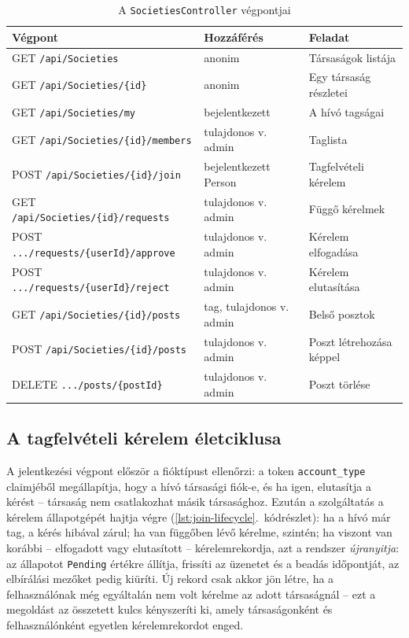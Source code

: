 \begin{table}[htbp]
	\centering
	\caption{A \texttt{SocietiesController} végpontjai}
	\label{tab:soc-endpoints}
	\begin{tabular}{|l|l|p{5.2cm}|}
		\hline
		\textbf{Végpont} & \textbf{Hozzáférés} & \textbf{Feladat} \\
		\hline
		GET \texttt{/api/Societies} & anonim & Társaságok listája \\
		\hline
		GET \texttt{/api/Societies/\{id\}} & anonim & Egy társaság részletei \\
		\hline
		GET \texttt{/api/Societies/my} & bejelentkezett & A hívó tagságai \\
		\hline
		GET \texttt{/api/Societies/\{id\}/members} & tulajdonos v. admin & Taglista \\
		\hline
		POST \texttt{/api/Societies/\{id\}/join} & bejelentkezett Person & Tagfelvételi kérelem \\
		\hline
		GET \texttt{/api/Societies/\{id\}/requests} & tulajdonos v. admin & Függő kérelmek \\
		\hline
		POST \texttt{.../requests/\{userId\}/approve} & tulajdonos v. admin & Kérelem elfogadása \\
		\hline
		POST \texttt{.../requests/\{userId\}/reject} & tulajdonos v. admin & Kérelem elutasítása \\
		\hline
		GET \texttt{/api/Societies/\{id\}/posts} & tag, tulajdonos v. admin & Belső posztok \\
		\hline
		POST \texttt{/api/Societies/\{id\}/posts} & tulajdonos v. admin & Poszt létrehozása képpel \\
		\hline
		DELETE \texttt{.../posts/\{postId\}} & tulajdonos v. admin & Poszt törlése \\
		\hline
	\end{tabular}
\end{table}

\subsection{A tagfelvételi kérelem életciklusa}

A jelentkezési végpont először a fióktípust ellenőrzi: a token \texttt{account\_type} claimjéből
megállapítja, hogy a hívó társasági fiók-e, és ha igen, elutasítja a kérést -- társaság nem
csatlakozhat másik társasághoz. Ezután a szolgáltatás a kérelem állapotgépét hajtja végre
(\ref{lst:join-lifecycle}.~kódrészlet): ha a hívó már tag, a kérés hibával zárul; ha van függőben
lévő kérelme, szintén; ha viszont van korábbi -- elfogadott vagy elutasított -- kérelemrekordja,
azt a rendszer \emph{újranyitja}: az állapotot \texttt{Pending} értékre állítja, frissíti az
üzenetet és a beadás időpontját, az elbírálási mezőket pedig kiüríti. Új rekord csak akkor jön
létre, ha a felhasználónak még egyáltalán nem volt kérelme az adott társaságnál -- ezt a
megoldást az összetett kulcs kényszeríti ki, amely társaságonként és felhasználónként egyetlen
kérelemrekordot enged.

